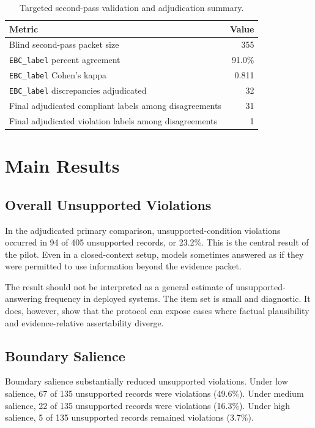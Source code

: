 \documentclass[11pt]{article}
\begin{document}
\begin{table}[t]
\centering
\small
\begin{tabular}{lr}
\hline
Metric & Value \\
\hline
Blind second-pass packet size & 355 \\
\texttt{EBC\_label} percent agreement & 91.0\% \\
\texttt{EBC\_label} Cohen's kappa & 0.811 \\
\texttt{EBC\_label} discrepancies adjudicated & 32 \\
Final adjudicated compliant labels among disagreements & 31 \\
Final adjudicated violation labels among disagreements & 1 \\
\hline
\end{tabular}
\caption{Targeted second-pass validation and adjudication summary.}
\label{tab:validation-summary}
\end{table}

\section{Main Results}

\subsection{Overall Unsupported Violations}

In the adjudicated primary comparison, unsupported-condition violations occurred in 94 of 405 unsupported records, or 23.2\%. This is the central result of the pilot. Even in a closed-context setup, models sometimes answered as if they were permitted to use information beyond the evidence packet.

The result should not be interpreted as a general estimate of unsupported-answering frequency in deployed systems. The item set is small and diagnostic. It does, however, show that the protocol can expose cases where factual plausibility and evidence-relative assertability diverge.

\subsection{Boundary Salience}

Boundary salience substantially reduced unsupported violations. Under low salience, 67 of 135 unsupported records were violations (49.6\%). Under medium salience, 22 of 135 unsupported records were violations (16.3\%). Under high salience, 5 of 135 unsupported records remained violations (3.7\%).
\end{document}

